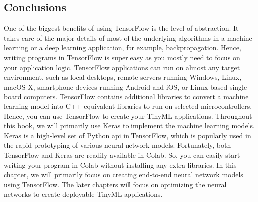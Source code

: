 \subsection{Conclusions}

One of the biggest benefits of using TensorFlow is the level of abstraction. It takes care of the major details of most of the underlying algorithms in a machine learning or a deep learning application, for example, backpropagation. Hence, writing programs in TensorFlow is super easy as you mostly need to focus on your application logic. TensorFlow applications can run on almost any target environment, such as local desktops, remote servers running Windows, Linux, macOS X, smartphone devices running Android and iOS, or Linux-based single board computers. TensorFlow contains additional libraries to convert a machine learning model into C++ equivalent libraries to run on selected microcontrollers. Hence, you can use TensorFlow to create your TinyML applications. Throughout this book, we will primarily use Keras to implement the machine learning models. Keras is a high-level set of Python \ac{api} in TensorFlow, which is popularly used in the rapid prototyping of various neural network models. Fortunately, both TensorFlow and Keras are readily available in Colab. So, you can easily start writing your program in Colab without installing any extra libraries. In this chapter, we will primarily focus on creating end-to-end neural network models using TensorFlow. The later chapters will focus on optimizing the neural networks to create deployable TinyML applications.


%

